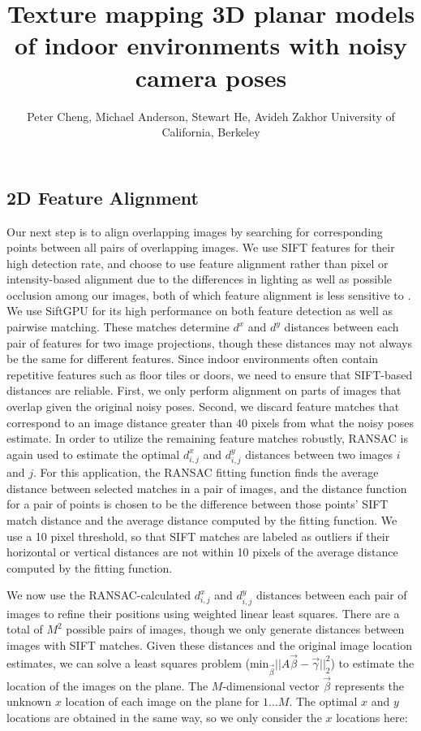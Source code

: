 \documentclass[]{spie}  %
\title{Texture mapping 3D planar models of indoor environments with noisy camera poses}
\author{Peter Cheng, Michael Anderson, Stewart He, Avideh Zakhor
\skiplinehalf
University of California, Berkeley\\
}
\begin{document}
\subsection{2D Feature Alignment}
\label{sec:robustSIFTFeatureMatching}
Our next step is to align overlapping images by searching for
corresponding points between all pairs of overlapping images. We use
SIFT features for their high detection rate, and choose to use feature
alignment rather than pixel or intensity-based alignment due to the
differences in lighting as well as possible occlusion among our
images, both of which feature alignment is less sensitive to
\cite{lowe1999object, mikolajczyk2005performance, szeliski2006image}.
We use SiftGPU \cite{siftgpu} for its high performance on both feature
detection as well as pairwise matching. These matches determine $d^x$
and $d^y$ distances between each pair of features for two image
projections, though these distances may not always be the same for
different features. Since indoor environments often contain repetitive
features such as floor tiles or doors, we need to ensure that
SIFT-based distances are reliable. First, we only perform alignment on
parts of images that overlap given the original noisy poses. Second,
we discard feature matches that correspond to an image distance
greater than 40 pixels from what the noisy poses estimate. In order to
utilize the remaining feature matches robustly, RANSAC
\cite{fischler1981random} is again used to estimate the optimal $d^x_{i,j}$
and $d^y_{i,j}$ distances between two images $i$ and $j$. For this
application, the RANSAC fitting function finds the average distance
between selected matches in a pair of images, and the distance
function for a pair of points is chosen to be the difference between
those points' SIFT match distance and the average distance computed by
the fitting function. We use a 10 pixel threshold, so that SIFT
matches are labeled as outliers if their horizontal or vertical
distances are not within 10 pixels of the average distance computed by
the fitting function.

We now use the RANSAC-calculated $d^x_{i,j}$ and $d^y_{i,j}$ distances
between each pair of images to refine their positions using weighted
linear least squares. There are a total of $M^{2}$ possible pairs of
images, though we only generate distances between images with SIFT
matches. Given these distances and the original image location
estimates, we can solve a least squares problem
($\textrm{min}_{\vec{\beta}} ||A \vec{\beta} - \vec{\gamma}||_2^2 $)
to estimate the location of the images on the plane. The
$M$-dimensional vector $\vec{\beta}$ represents the unknown $x$
location of each image on the plane for $1 \dots M$. The optimal $x$
and $y$ locations are obtained in the same way, so we only consider
the $x$ locations here:
\end{document}
